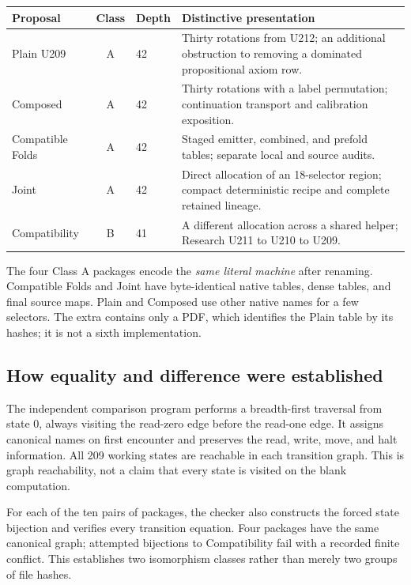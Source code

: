 \documentclass[11pt,letterpaper]{article}
\begin{document}
\begin{center}\small
\begin{tabularx}{\linewidth}{@{}p{28mm}cp{16mm}X@{}}
\toprule
Proposal & Class & Depth & Distinctive presentation\\
\midrule
Plain U209 & A & 42 & Thirty rotations from U212; an additional obstruction
to removing a dominated propositional axiom row.\\
Composed & A & 42 & Thirty rotations with a label permutation; continuation
transport and calibration exposition.\\
Compatible Folds & A & 42 & Staged emitter, combined, and prefold tables;
separate local and source audits.\\
Joint & A & 42 & Direct allocation of an 18-selector region; compact
deterministic recipe and complete retained lineage.\\
Compatibility & B & 41 & A different allocation across a shared helper;
Research U211 to U210 to U209.\\
\bottomrule
\end{tabularx}
\end{center}

The four Class A packages encode the \emph{same literal machine} after
renaming. Compatible Folds and Joint have byte-identical native tables,
dense tables, and final source maps. Plain and Composed use other native
names for a few selectors. The extra
 contains only a PDF, which identifies
the Plain table by its hashes; it is not a sixth implementation.

\subsection{How equality and difference were established}

The independent comparison program performs a breadth-first traversal from
state 0, always visiting the read-zero edge before the read-one edge. It
assigns canonical names on first encounter and preserves the read, write,
move, and halt information. All 209 working states are reachable in each
transition graph. This is graph reachability, not a claim that every state
is visited on the blank computation.

For each of the ten pairs of packages, the checker also constructs the
forced state bijection and verifies every transition equation. Four
packages have the same canonical graph; attempted bijections to
Compatibility fail with a recorded finite conflict. This establishes two
isomorphism classes rather than merely two groups of file hashes.
\end{document}
